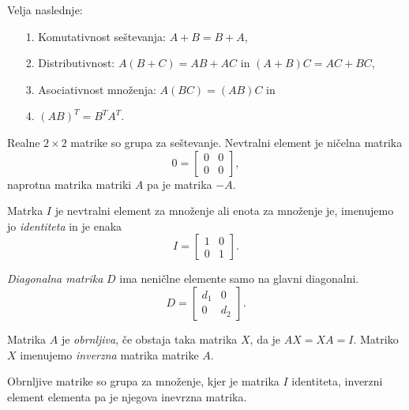 \documentclass[GmVic, tisk]{gv}
\begin{document}
\begin {trditev}
Velja naslednje:
\begin{enumerate}
\item[1.] Komutativnost seštevanja: $A+B=B+A$,
\item[2.] Distributivnost: $A(B+C)= AB +AC$ in $(A+B)C=AC+BC$,
\item[3.] Asociativnost množenja: $A(BC)=(AB)C$ in
\item[4.] $(AB)^{T}=  B^T A^T$.
\end{enumerate}
\end{trditev}

\begin{trditev}
Realne $2 \times 2 $ matrike so grupa za seštevanje. Nevtralni element je ničelna matrika 
$$0=
     \begin{bmatrix}
         0&0\\
         0&0
      \end{bmatrix}, 
$$
naprotna matrika matriki $A$ pa je matrika $-A$.
\end{trditev}

\begin{definicija}
Matrka $I$ je nevtralni element za množenje ali enota za množenje je, imenujemo jo {\em identiteta} in je enaka
$$ I=
     \begin{bmatrix}
         1&0\\
         0&1
      \end{bmatrix}.
$$

{\em Diagonalna matrika} $D$ ima neničlne elemente samo na glavni diagonalni.
$$ D=
     \begin{bmatrix}
         d_1&0\\
         0&d_2
      \end{bmatrix}.
$$

Matrika $A$ je {\em obrnljiva}, če obstaja taka matrika $X$, da je $AX=XA=I$. Matriko $X$ imenujemo {\em inverzna} matrika matrike $A$.
\end{definicija}

\begin{trditev} Obrnljive matrike so grupa za množenje, kjer je matrika $I$ identiteta, inverzni element elementa pa je njegova inevrzna matrika.
\end{trditev}

\end{document}
